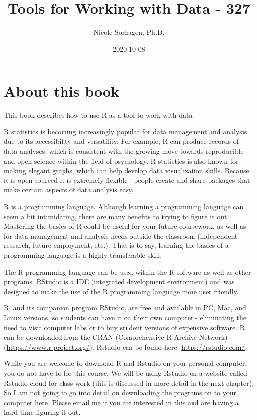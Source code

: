 \documentclass[
]{book}
\title{Tools for Working with Data - 327}
\author{Nicole Sorhagen, Ph.D.}
\date{2020-10-08}
\begin{document}
\maketitle

{
\setcounter{tocdepth}{1}
\tableofcontents
}
\hypertarget{about-this-book}{%
\chapter{About this book}\label{about-this-book}}

This book describes how to use R as a tool to work with data.

R statistics is becoming increasingly popular for data management and analysis due to its accessibility and versatility. For example, R can produce records of data analyses, which is consistent with the growing move towards reproducible and open science within the field of psychology. R statistics is also known for making elegant graphs, which can help develop data visualization skills. Because it is open-sourced it is extremely flexible - people create and share packages that make certain aspects of data analysis easy.

R is a programming language. Although learning a programming language can seem a bit intimidating, there are many benefits to trying to figure it out. Mastering the basics of R could be useful for your future coursework, as well as for data management and analysis needs outside the classroom (independent research, future employment, etc.). That is to say, learning the basics of a programming language is a highly transferable skill.

The R programming language can be used within the R software as well as other programs. RStudio is a IDE (integrated development environment) and was designed to make the use of the R programming language more user friendly.

R, and its companion program RStudio, are free and available in PC, Mac, and Linux versions, so students can have it on their own computer - eliminating the need to visit computer labs or to buy student versions of expensive software. R can be downloaded from the CRAN (Comprehensive R Archive Network) (\url{https://www.r-project.org/}). Rstudio can be found here: \url{https://rstudio.com/}.

While you are welcome to download R and Rstudio on your personal computer, you do not have to for this course. We will be using Rstudio on a website called Rstudio cloud for class work (this is discussed in more detail in the next chapter). So I am not going to go into detail on downloading the programs on to your computer here. Please email me if you are interested in this and are having a hard time figuring it out.
\end{document}
